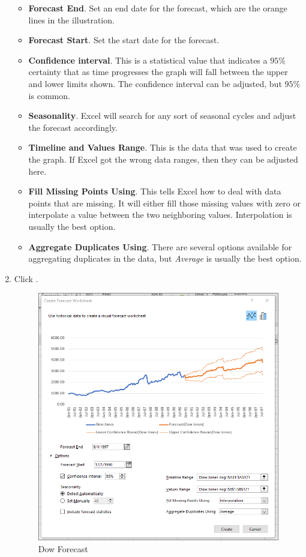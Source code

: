 \begin{enumbox}
\begin{enumerate}
		\begin{itemize}
			\item \textbf{Forecast End}. Set an end date for the forecast, which are the orange lines in the illustration.
			\item \textbf{Forecast Start}. Set the start date for the forecast.
			\item \textbf{Confidence interval}. This is a statistical value that indicates a $ 95 $\% certainty that as time progresses the graph will fall between the upper and lower limits shown. The confidence interval can be adjusted, but $ 95 $\% is common.
			\item \textbf{Seasonality}. Excel will search for any sort of seasonal cycles and adjust the forecast accordingly.
			\item \textbf{Timeline and Values Range}. This is the data that was used to create the graph. If Excel got the wrong data ranges, then they can be adjusted here.
			\item \textbf{Fill Missing Points Using}. This tells Excel how to deal with data points that are missing. It will either fill those missing values with zero or interpolate a value between the two neighboring values. Interpolation is usually the best option.
			\item \textbf{Aggregate Duplicates Using}. There are several options available for aggregating duplicates in the data, but \textit{Average} is usually the best option.
		\end{itemize}	
		
		\item Click .
	
		\begin{figure}[H]
			\centering
			\includegraphics[width=\maxwidth{.95\linewidth}]{gfx/ch08_fig12}
			\caption{Dow Forecast}
			\label{08:fig12}
		\end{figure}


\end{enumerate}
\end{enumbox}
